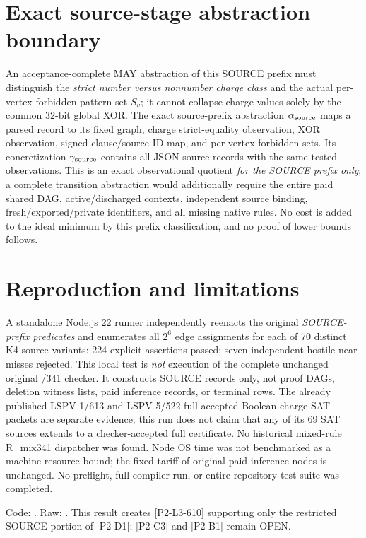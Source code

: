 \documentclass[11pt]{article}
\begin{document}
\section*{Exact source-stage abstraction boundary}
An acceptance-complete MAY abstraction of this SOURCE prefix must distinguish the \emph{strict number versus nonnumber charge class} and the actual per-vertex forbidden-pattern set $S_v$; it cannot collapse charge values solely by the common 32-bit global XOR. The exact source-prefix abstraction $\alpha_{\rm source}$ maps a parsed record to its fixed graph, charge strict-equality observation, XOR observation, signed clause/source-ID map, and per-vertex forbidden sets. Its concretization $\gamma_{\rm source}$ contains all JSON source records with the same tested observations. This is an exact observational quotient \emph{for the SOURCE prefix only}; a complete transition abstraction would additionally require the entire paid shared DAG, active/discharged contexts, independent source binding, fresh/exported/private identifiers, and all missing native rules. No cost is added to the ideal minimum by this prefix classification, and no proof of lower bounds follows.

\section*{Reproduction and limitations}
A standalone Node.js 22 runner independently reenacts the original \emph{SOURCE-prefix predicates} and enumerates all $2^6$ edge assignments for each of 70 distinct K4 source variants: 224 explicit assertions passed; seven independent hostile near misses rejected. This local test is \emph{not} execution of the complete unchanged original /341 checker. It constructs SOURCE records only, not proof DAGs, deletion witness lists, paid inference records, or terminal rows. The already published LSPV-1/613 and LSPV-5/522 full accepted Boolean-charge SAT packets are separate evidence; this run does not claim that any of its 69 SAT sources extends to a checker-accepted full certificate. No historical mixed-rule R_mix341 dispatcher was found. Node OS time was not benchmarked as a machine-resource bound; the fixed tariff of original paid inference nodes is unchanged. No preflight, full compiler run, or entire repository test suite was completed.

Code: . Raw: . This result creates [P2-L3-610] supporting only the restricted SOURCE portion of [P2-D1]; [P2-C3] and [P2-B1] remain OPEN.
\end{document}
